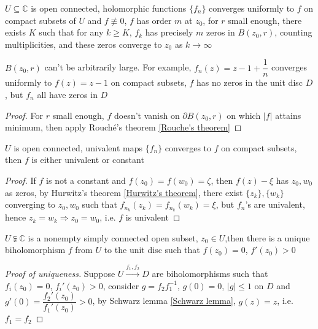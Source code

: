\documentclass[main]{subfiles}
\begin{document}
\begin{theorem}\label{Hurwitz's theorem}
$U\subseteq\mathbb C$ is open connected, holomorphic functions $\{f_n\}$ converges uniformly to $f$ on compact subsets of $U$ and $f\not\equiv0$, $f$ has order $m$ at $z_0$, for $r$ small enough, there exists $K$ such that for any $k\geq K$, $f_k$ has precisely $m$ zeros in $B(z_0,r)$, counting multiplicities, and these zeros converge to $z_0$ as $k\to\infty$
\end{theorem}

\begin{remark}
$B(z_0,r)$ can't be arbitrarily large. For example, $f_n(z)=z-1+\dfrac{1}{n}$ converges uniformly to $f(z)=z-1$ on compact subsets, $f$ has no zeros in the unit disc $D$, but $f_n$ all have zeros in $D$
\end{remark}

\begin{proof}
For $r$ small enough, $f$ doesn't vanish on $\partial B(z_0,r)$ on which $|f|$ attains minimum, then apply Rouch\'e's theorem \ref{Rouche's theorem}
\end{proof}

\begin{corollary}
$U$ is open connected, univalent maps $\{f_n\}$ converges to $f$ on compact subsets, then $f$ is either univalent or constant
\end{corollary}

\begin{proof}
If $f$ is not a constant and $f(z_0)=f(w_0)=\zeta$, then $f(z)-\xi$ has $z_0,w_0$ as zeros, by Hurwitz's theorem \ref{Hurwitz's theorem}, there exist $\{z_k\},\{w_k\}$ converging to $z_0,w_0$ such that $f_{n_k}(z_k)=f_{n_k}(w_k)=\xi$, but $f_n$'s are univalent, hence $z_k=w_k\Rightarrow z_0=w_0$, i.e. $f$ is univalent
\end{proof}

\begin{theorem}\label{Riemann mapping theorem}
$U\subsetneqq\mathbb C$ is a nonempty simply connected open subset, $z_0\in U$,then there is a unique biholomorphism $f$ from $U$ to the unit disc such that $f(z_0)=0$, $f'(z_0)>0$
\end{theorem}

\begin{proof}[Proof of uniqueness]
Suppose $U\xrightarrow{f_1,f_2} D$ are biholomorphisms such that $f_i(z_0)=0$, $f_i'(z_0)>0$, consider $g=f_2f_1^{-1}$, $g(0)=0$, $|g|\leq1$ on $D$ and $g'(0)=\dfrac{f_2'(z_0)}{f_1'(z_0)}>0$, by Schwarz lemma \ref{Schwarz lemma}, $g(z)=z$, i.e. $f_1=f_2$
\end{proof}
\end{document}
